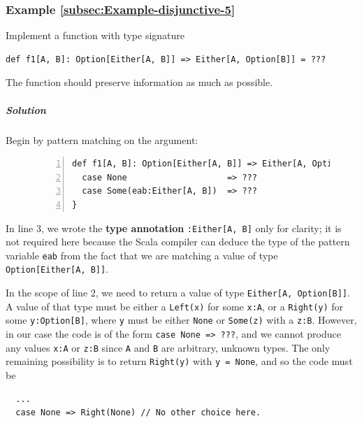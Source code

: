 \subsubsection{Example \label{subsec:Example-disjunctive-5}\ref{subsec:Example-disjunctive-5}}

Implement a function with type signature
\begin{lstlisting}
def f1[A, B]: Option[Either[A, B]] => Either[A, Option[B]] = ???
\end{lstlisting}
The function should preserve information as much as possible.

\subparagraph{Solution}

Begin by pattern matching on the argument:

\begin{figure}%
\vspace{-0.95\baselineskip}
\begin{lstlisting}[numbers=left]
def f1[A, B]: Option[Either[A, B]] => Either[A, Option[B]] = {
  case None                    => ???
  case Some(eab:Either[A, B])  => ???
}
\end{lstlisting}

\vspace{-1.15\baselineskip}
\end{figure}%

\noindent In line 3, we wrote the \textbf{type annotation}
\lstinline!:Either[A, B]! only for clarity; it is not required here
because the Scala compiler can deduce the type of the pattern variable
\lstinline!eab! from the fact that we are matching a value of type
\lstinline!Option[Either[A, B]]!.

In the scope of line 2, we need to return a value of type \lstinline!Either[A, Option[B]]!.
A value of that type must be either a \lstinline!Left(x)! for some
\lstinline!x:A!, or a \lstinline!Right(y)! for some \lstinline!y:Option[B]!,
where \lstinline!y! must be either \lstinline!None! or \lstinline!Some(z)!
with a \lstinline!z:B!. However, in our case the code is of the form
\lstinline!case None => ???!, and we cannot produce any values \lstinline!x:A!
or \lstinline!z:B! since \lstinline!A! and \lstinline!B! are arbitrary,
unknown types. The only remaining possibility is to return \lstinline!Right(y)!
with \lstinline!y = None!, and so the code must be
\begin{lstlisting}
  ...
  case None => Right(None) // No other choice here.
\end{lstlisting}

